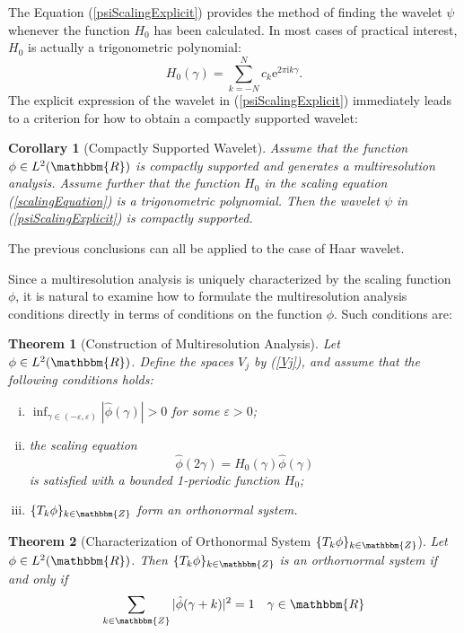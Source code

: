 \documentclass{book}
\newcommand{\mathe}{\mathrm{e}}
\newcommand{\mathi}{\mathrm{i}}
\newcommand{\mathpi}{\pi}
\newenvironment{enumerateroman}{\begin{enumerate}[i.] }{\end{enumerate}}
\newtheorem{corollary}{Corollary}
\newtheorem{theorem}{Theorem}
\begin{document}
The Equation (\ref{psiScalingExplicit}) provides the method of finding the
wavelet $\psi$ whenever the function $H_0$ has been calculated. In most cases
of practical interest, $H_0$ is actually a trigonometric polynomial:
\[ H_0 (\gamma) = \sum_{k = - N}^N c_k \mathe^{2 \mathpi \mathi k \gamma} . \]
The explicit expression of the wavelet in (\ref{psiScalingExplicit})
immediately leads to a criterion for how to obtain a compactly supported
wavelet:

\begin{corollary}[Compactly Supported Wavelet]
  Assume that the function $\phi \in L^2 (\mathbbm{R})$ is compactly supported
  and generates a multiresolution analysis. Assume further that the function
  $H_0$ in the scaling equation (\ref{scalingEquation}) is a trigonometric
  polynomial. Then the wavelet $\psi$ in (\ref{psiScalingExplicit}) is
  compactly supported.
\end{corollary}

\begin{example}
  The previous conclusions can all be applied to the case of Haar wavelet.
\end{example}

Since a multiresolution analysis is uniquely characterized by the scaling
function $\phi$, it is natural to examine how to formulate the multiresolution
analysis conditions directly in terms of conditions on the function $\phi$.
Such conditions are:

\begin{theorem}[Construction of Multiresolution Analysis]
  \label{thm:constructionMRA}Let $\phi \in L^2 (\mathbbm{R})$. Define the
  spaces $V_j$ by (\ref{Vj}), and assume that the following conditions holds:
  \begin{enumerateroman}
    \item $\inf_{\gamma \in (- \varepsilon, \varepsilon)} | \hat{\phi}
    (\gamma) | > 0$ for some $\varepsilon > 0$;
    
    \item the scaling equation
    \[ \hat{\phi} (2 \gamma) = H_0 (\gamma) \hat{\phi} (\gamma) \]
    is satisfied with a bounded 1-periodic function $H_0$;
    
    \item $\{ T_k \phi \}_{k \in \mathbbm{Z}}$ form an orthonormal system.
  \end{enumerateroman}
\end{theorem}

\begin{theorem}[Characterization of Orthonormal System $\{ T_k \phi \}_{k \in
\mathbbm{Z}}$]
  Let $\phi \in L^2 (\mathbbm{R})$. Then $\{ T_k \phi \}_{k \in \mathbbm{Z}}$
  is an orthornormal system if and only if
  \[ \sum_{k \in \mathbbm{Z}} | \hat{\phi} (\gamma + k) |^2 = 1 \quad \gamma
     \in \mathbbm{R} \]
\end{theorem}
\end{document}
